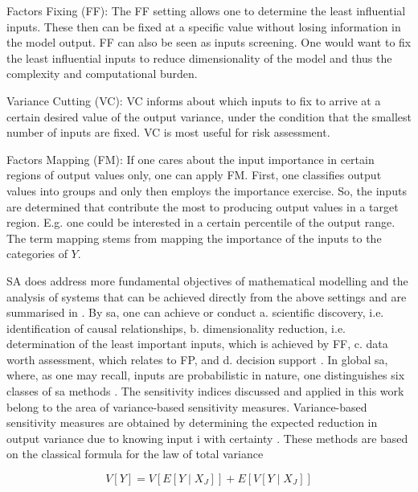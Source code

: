 Factors Fixing (FF): The FF setting allows one to determine the least influential inputs. These then can be fixed at a specific value without losing information in the model output. FF can also be seen as inputs screening. One would want to fix the least influential inputs to reduce dimensionality of the model and thus the complexity and computational burden.

Variance Cutting (VC): VC informs about which inputs to fix to arrive at a certain desired value of the output variance, under the condition that the smallest number of inputs are fixed. VC is most useful for risk assessment.

Factors Mapping (FM): If one cares about the input importance in certain regions of output values only, one can apply FM. First, one classifies output values into groups and only then employs the importance exercise. So, the inputs are determined that contribute the most to producing output values in a target region. E.g. one could be interested in a certain percentile of the output range. The term mapping stems from mapping the importance of the inputs to the categories of $Y$.

SA does address more fundamental objectives of mathematical modelling and the analysis of systems that can be achieved directly from the above settings and are summarised in \cite{R21}. By sa, one can achieve or conduct a. scientific discovery, i.e. identification of causal relationships, b. dimensionality reduction, i.e. determination of the least important inputs, which is achieved by FF, c. data worth assessment, which relates to FP, and d. decision support \cite{R21}.
In global sa, where, as one may recall, inputs are probabilistic in nature, one distinguishes six classes of sa methods \cite{BP16}. The sensitivity indices discussed and applied in this work belong to the area of variance-based sensitivity measures. Variance-based sensitivity measures are obtained by determining the expected reduction in output variance due to knowing input i with certainty \cite{BP16}. These methods are based on the classical formula for the law of total variance

\begin{equation}
V[Y]= V[E[Y \mid X_J]] + E[V[Y \mid X_J]]
\end{equation}

